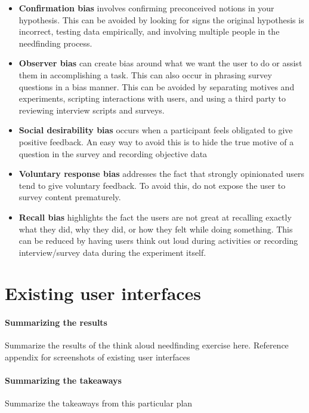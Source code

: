 \begin{itemize}
\item
  \textbf{Confirmation bias} involves confirming preconceived notions in your hypothesis. This can be avoided by looking for signs the original hypothesis is incorrect, testing data empirically, and involving multiple people in the needfinding process.
\item
  \textbf{Observer bias} can create bias around what we want the user to do or assist them in accomplishing a task. This can also occur in phrasing survey questions in a bias manner. This can be avoided by separating motives and experiments, scripting interactions with users, and using a third party to reviewing interview scripts and surveys.
\end{itemize}

\clearpage

\begin{itemize}
\item
  \textbf{Social desirability bias} occurs when a participant feels obligated to give positive feedback. An easy way to avoid this is to hide the true motive of a question in the survey and recording objective data
\item
  \textbf{Voluntary response bias} addresses the fact that strongly opinionated users tend to give voluntary feedback. To avoid this, do not expose the user to survey content prematurely.
\item
  \textbf{Recall bias} highlights the fact the users are not great at recalling exactly what they did, why they did, or how they felt while doing something. This can be reduced by having users think out loud during activities or recording interview/survey data during the experiment itself.
\end{itemize}


\section{Existing user interfaces}

\paragraph{Summarizing the results}
Summarize the results of the think aloud needfinding exercise here.
Reference appendix for screenshots of existing user interfaces

\paragraph{Summarizing the takeaways}
Summarize the takeaways from this particular plan


